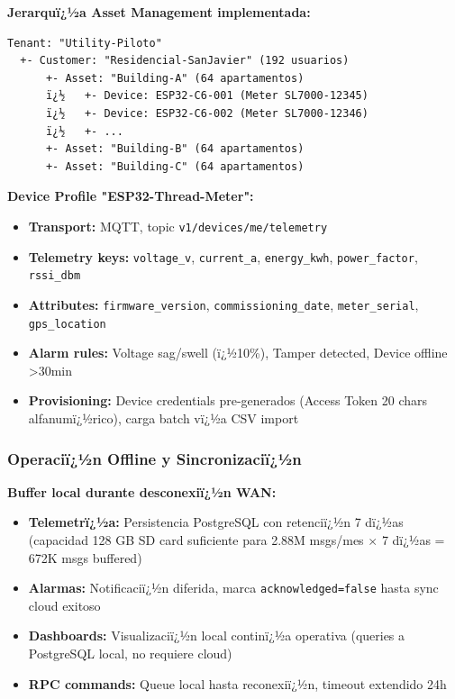 \textbf{Jerarquï¿½a Asset Management implementada:}

\begin{verbatim}
Tenant: "Utility-Piloto"
  +- Customer: "Residencial-SanJavier" (192 usuarios)
      +- Asset: "Building-A" (64 apartamentos)
      ï¿½   +- Device: ESP32-C6-001 (Meter SL7000-12345)
      ï¿½   +- Device: ESP32-C6-002 (Meter SL7000-12346)
      ï¿½   +- ...
      +- Asset: "Building-B" (64 apartamentos)
      +- Asset: "Building-C" (64 apartamentos)
\end{verbatim}

\textbf{Device Profile "ESP32-Thread-Meter":}

\begin{itemize}
    \item \textbf{Transport:} MQTT, topic \texttt{v1/devices/me/telemetry}
    \item \textbf{Telemetry keys:} \texttt{voltage\_v}, \texttt{current\_a}, \texttt{energy\_kwh}, \texttt{power\_factor}, \texttt{rssi\_dbm}
    \item \textbf{Attributes:} \texttt{firmware\_version}, \texttt{commissioning\_date}, \texttt{meter\_serial}, \texttt{gps\_location}
    \item \textbf{Alarm rules:} Voltage sag/swell (ï¿½10\%), Tamper detected, Device offline >30min
    \item \textbf{Provisioning:} Device credentials pre-generados (Access Token 20 chars alfanumï¿½rico), carga batch vï¿½a CSV import
\end{itemize}

\subsubsection{Operaciï¿½n Offline y Sincronizaciï¿½n}

\textbf{Buffer local durante desconexiï¿½n WAN:}

\begin{itemize}
    \item \textbf{Telemetrï¿½a:} Persistencia PostgreSQL con retenciï¿½n 7 dï¿½as (capacidad 128 GB SD card suficiente para 2.88M msgs/mes $\times$ 7 dï¿½as = 672K msgs buffered)
    \item \textbf{Alarmas:} Notificaciï¿½n diferida, marca \texttt{acknowledged=false} hasta sync cloud exitoso
    \item \textbf{Dashboards:} Visualizaciï¿½n local continï¿½a operativa (queries a PostgreSQL local, no requiere cloud)
    \item \textbf{RPC commands:} Queue local hasta reconexiï¿½n, timeout extendido 24h
\end{itemize}

